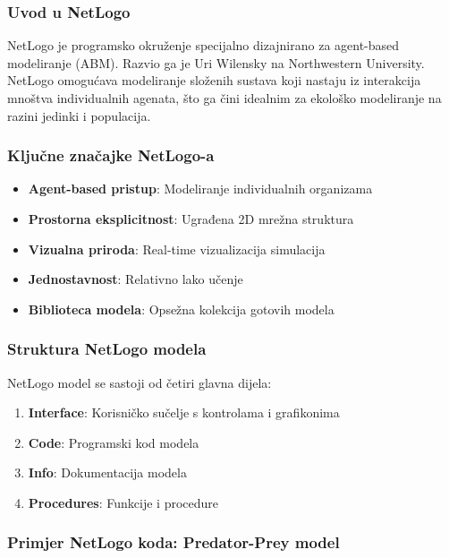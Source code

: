 \documentclass[11pt,oneside]{book}
\begin{document}
\subsubsection{Uvod u NetLogo}

NetLogo je programsko okruženje specijalno dizajnirano za agent-based modeliranje (ABM). Razvio ga je Uri Wilensky na Northwestern University. NetLogo omogućava modeliranje složenih sustava koji nastaju iz interakcija mnoštva individualnih agenata, što ga čini idealnim za ekološko modeliranje na razini jedinki i populacija.

\subsubsection{Ključne značajke NetLogo-a}

\begin{itemize}
	\item \textbf{Agent-based pristup}: Modeliranje individualnih organizama
	\item \textbf{Prostorna eksplicitnost}: Ugrađena 2D mrežna struktura
	\item \textbf{Vizualna priroda}: Real-time vizualizacija simulacija
	\item \textbf{Jednostavnost}: Relativno lako učenje
	\item \textbf{Biblioteca modela}: Opsežna kolekcija gotovih modela
\end{itemize}

\subsubsection{Struktura NetLogo modela}

NetLogo model se sastoji od četiri glavna dijela:

\begin{enumerate}
	\item \textbf{Interface}: Korisničko sučelje s kontrolama i grafikonima
	\item \textbf{Code}: Programski kod modela
	\item \textbf{Info}: Dokumentacija modela
	\item \textbf{Procedures}: Funkcije i procedure
\end{enumerate}

\subsubsection{Primjer NetLogo koda: Predator-Prey model}
\end{document}
